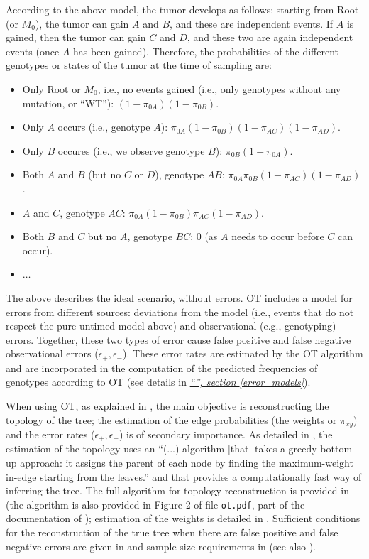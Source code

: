 \documentclass[a4paper,11pt]{article}
\newcommand*{\qrefP}[1]{\hyperref[{#1}]{\textit{``\nameref*{#1}'', section \ref*{#1}}}}
\begin{document}
According to the above model, the tumor develops as follows: starting from Root (or $M_0$), the tumor can gain $A$ and $B$, and these are independent events. If $A$ is gained, then the tumor can gain $C$ and $D$, and these two are again independent events (once $A$ has been gained). Therefore, the probabilities of the different genotypes or states of the tumor at the time of sampling are:

\begin{itemize}
\item Only Root or $M_0$, i.e., no events gained (i.e., only genotypes without any mutation, or “WT”): $(1 - \pi_{0A}) (1 - \pi_{0B})$.
\item Only $A$ occurs (i.e., genotype $A$): $\pi_{0A}(1 - \pi_{0B}) (1 - \pi_{AC}) (1 - \pi_{AD}) $.
\item Only $B$ occures (i.e., we observe genotype $B$): $\pi_{0B}(1 - \pi_{0A})$.
\item Both $A$ and $B$ (but no $C$ or $D$), genotype $AB$: $\pi_{0A} \pi_{0B} (1 - \pi_{AC}) (1 - \pi_{AD})$.
\item $A$ and $C$, genotype $AC$: $\pi_{0A} (1 - \pi_{0B}) \pi_{AC} (1 - \pi_{AD})$.
\item Both $B$ and $C$ but no $A$, genotype $BC$: 0 (as $A$ needs to occur before $C$ can occur).
\item $\ldots$
\end{itemize}



The above describes the ideal scenario, without errors. OT includes a model for errors from different sources: deviations from the model (i.e., events that do not respect the pure untimed model above) and observational (e.g., genotyping) errors. Together, these two types of error cause false positive and false negative observational errors ($\epsilon_+, \epsilon_-$). These error rates are estimated by the OT algorithm and are incorporated in the computation of the predicted frequencies of genotypes according to OT (see details in \qrefP{error_models}).


When using OT, as explained in \citet[p.~5]{Szabo2008}, the main objective is reconstructing the topology of the tree; the estimation of the edge probabilities (the weights or $\pi_{xy}$) and the error rates ($\epsilon_+, \epsilon_-$) is of secondary importance. As detailed in \citet[p.~5]{Szabo2008}, the estimation of the topology uses an ``(...) algorithm [that] takes a greedy bottom-up approach: it assigns the parent of each node by finding the maximum-weight in-edge starting from the leaves.'' and that provides a computationally fast way of inferring the tree. The full algorithm for topology reconstruction is provided in \citet[Section 3 and Fig.~2]{Szabo2008} (the algorithm is also provided in Figure 2 of file \texttt{ot.pdf}, part of the documentation of \citealp{OTpackage}); estimation of the weights is detailed in \citet[p.~13]{Szabo2008}. Sufficient conditions for the reconstruction of the true tree when there are false positive and false negative errors are given in \citet{Szabo2002} and sample size requirements in \citet[p.~8]{Szabo2008}(see also \citealp{desper1999inferring}).
\end{document}
